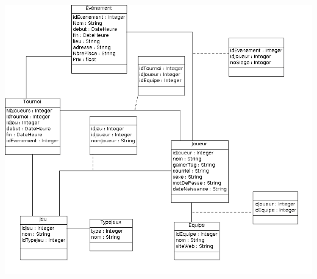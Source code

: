 \documentclass[11pt,french]{article}
\begin{document}
        \includegraphics[height=12cm]{../../conception/conceptionBDpersonnel.png}
\end{document}
